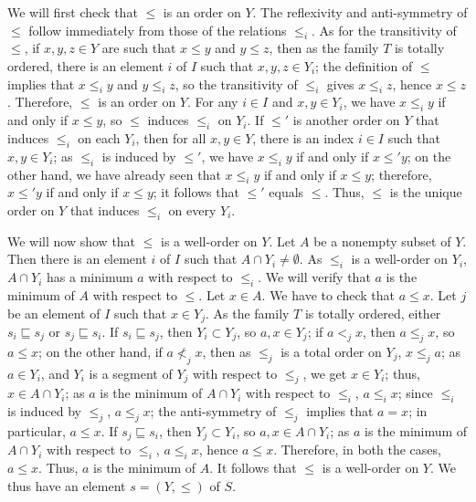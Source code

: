 \documentclass{article}
\begin{document}
\begin{solution}[\ref{exe:mfln3otu}]
  We will first check that \(\leq\) is an order on \(Y\).  The
  reflexivity and anti-symmetry of \(\leq\) follow immediately from
  those of the relations \(\leq_i\).  As for the transitivity of
  \(\leq\), if \(x, y, z \in Y\) are such that \(x \leq y\) and
  \(y \leq z\), then as the family \(T\) is totally ordered, there is
  an element \(i\) of \(I\) such that \(x, y, z \in Y_i\); the
  definition of \(\leq\) implies that \(x \leq_i y\) and
  \(y \leq_i z\), so the transitivity of \(\leq_i\) gives
  \(x \leq_i z\), hence \(x \leq z\).  Therefore, \(\leq\) is an order
  on \(Y\).  For any \(i \in I\) and \(x, y \in Y_i\), we have
  \(x \leq_i y\) if and only if \(x \leq y\), so \(\leq\) induces
  \(\leq_i\) on \(Y_i\).  If \(\leq'\) is another order on \(Y\) that
  induces \(\leq_i\) on each \(Y_i\), then for all \(x, y \in Y\),
  there is an index \(i \in I\) such that \(x, y \in Y_i\); as
  \(\leq_i\) is induced by \(\leq'\), we have \(x \leq_i y\) if and
  only if \(x \leq' y\); on the other hand, we have already seen that
  \(x \leq_i y\) if and only if \(x \leq y\); therefore, \(x \leq' y\)
  if and only if \(x \leq y\); it follows that \(\leq'\) equals
  \(\leq\).  Thus, \(\leq\) is the unique order on \(Y\) that induces
  \(\leq_i\) on every \(Y_i\).

  We will now show that \(\leq\) is a well-order on \(Y\).  Let \(A\)
  be a nonempty subset of \(Y\).  Then there is an element \(i\) of
  \(I\) such that \(A \cap Y_i \neq \emptyset\).  As \(\leq_i\) is a
  well-order on \(Y_i\), \(A \cap Y_i\) has a minimum \(a\) with
  respect to \(\leq_i\).  We will verify that \(a\) is the minimum of
  \(A\) with respect to \(\leq\).  Let \(x \in A\).  We have to check
  that \(a \leq x\).  Let \(j\) be an element of \(I\) such that
  \(x \in Y_j\).  As the family \(T\) is totally ordered, either
  \(s_i \sqsubseteq s_j\) or \(s_j \sqsubseteq s_i\).  If
  \(s_i \sqsubseteq s_j\), then \(Y_i \subset Y_j\), so
  \(a, x \in Y_j\); if \(a <_j x\), then \(a \leq_j x\), so
  \(a \leq x\); on the other hand, if \(a \nless_j x\), then as
  \(\leq_j\) is a total order on \(Y_j\), \(x \leq_j a\); as
  \(a \in Y_i\), and \(Y_i\) is a segment of \(Y_j\) with respect to
  \(\leq_j\), we get \(x \in Y_i\); thus, \(x \in A \cap Y_i\); as
  \(a\) is the minimum of \(A \cap Y_i\) with respect to \(\leq_i\),
  \(a \leq_i x\); since \(\leq_i\) is induced by \(\leq_j\),
  \(a \leq_j x\); the anti-symmetry of \(\leq_j\) implies that
  \(a = x\); in particular, \(a \leq x\).  If \(s_j \sqsubseteq s_i\),
  then \(Y_j \subset Y_i\), so \(a, x \in A \cap Y_i\); as \(a\) is
  the minimum of \(A \cap Y_i\) with respect to \(\leq_i\),
  \(a \leq_i x\), hence \(a \leq x\).  Therefore, in both the cases,
  \(a \leq x\).  Thus, \(a\) is the minimum of \(A\).  It follows that
  \(\leq\) is a well-order on \(Y\).  We thus have an element
  \(s = (Y, \leq)\) of \(S\).


\end{solution}
\end{document}
